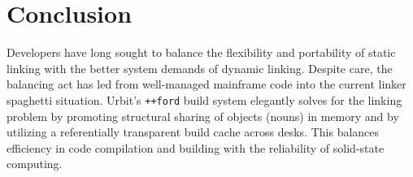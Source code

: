 \documentclass[twoside]{article}
\begin{document}
\section{Conclusion}

\sloppy
Developers have long sought to balance the flexibility and portability of static linking with the better system demands of dynamic linking.  Despite care, the balancing act has led from well-managed mainframe code into the current linker spaghetti situation.  Urbit's \lstinline[style=inlinecode]{++ford} build system elegantly solves for the linking problem by promoting structural sharing of objects (nouns) in memory and by utilizing a referentially transparent build cache across desks.  This balances efficiency in code compilation and building with the reliability of solid-state computing.  \tombstone{}

\printbibliography
\end{document}
